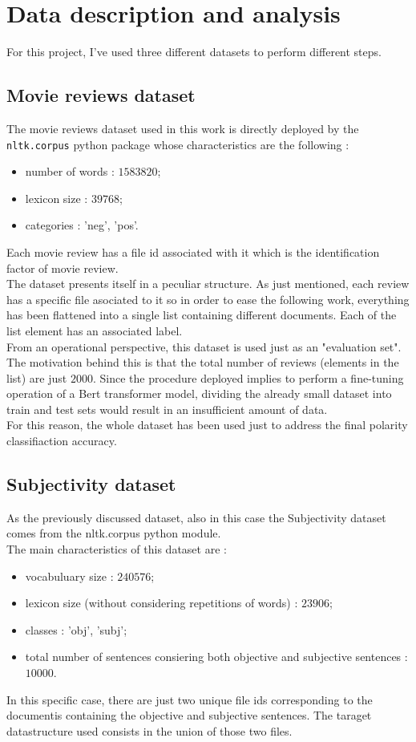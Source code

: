 
\section{Data description and analysis}
\label{sec:data}
For this project, I've used three different datasets to perform different steps. 
\subsection{Movie reviews dataset}
\label{subsec:mr}
The movie reviews dataset used in this work is directly deployed by the \texttt{nltk.corpus} python package whose characteristics are the following :
\begin{itemize}
    \item number of words : $1583820$;
    \item lexicon size : $39768$;
    \item categories : 'neg', 'pos'.
\end{itemize}
Each movie review has a file id associated with it which is the identification factor of movie review.\\
The dataset presents itself in a peculiar structure. As just mentioned, each review has a specific file asociated to it so in order to ease the following work, everything has been flattened into a single list containing different documents. Each of the list element has an associated label. \\
From an operational perspective, this dataset is used just as an "evaluation set". The motivation behind this is that the total number of reviews (elements in the list) are just $2000$. Since the procedure deployed implies to perform a fine-tuning operation of a Bert transformer model, dividing the already small dataset into train and test sets would result in an insufficient amount of data.\\
For this reason, the whole dataset has been used just to address the final polarity classifiaction accuracy.
\subsection{Subjectivity dataset}
\label{subsec:subj}
As the previously discussed dataset, also in this case the Subjectivity dataset comes from the nltk.corpus python module.\\ 
The main characteristics of this dataset are :
\begin{itemize}
    \item vocabuluary size : $240576$;
    \item lexicon size (without considering repetitions of words) : $23906$;
    \item classes : 'obj', 'subj';
    \item total number of sentences consiering both objective and subjective sentences : $10000$.
\end{itemize}
In this specific case, there are just two unique file ids corresponding to the documentis containing the objective and subjective sentences. The taraget datastructure used consists in the union of those two files.
